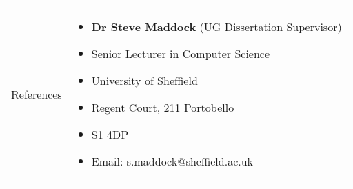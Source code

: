 \documentclass[11pt]{article}
\begin{document}
\begin{minipage}[t][0pt]{\linewidth}
\begin{tabular}[t]{p{2cm} p{14cm}}
	{References} &
	    \begin{itemize}[label={}]
	        \item \textbf{Dr Steve Maddock} (UG Dissertation Supervisor)
        	\item Senior Lecturer in Computer Science
            \item University of Sheffield
            \item Regent Court, 211 Portobello
            \item S1 4DP
        	\item Email: s.maddock@sheffield.ac.uk 
	    \end{itemize}
    \end{tabular}
\end{minipage}
\end{document}
